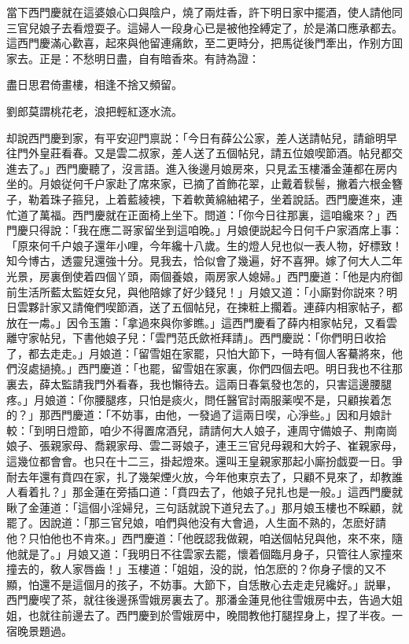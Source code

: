當下西門慶就在這婆娘心口與陰户，燒了兩炷香，許下明日家中擺酒，使人請他同三官兒娘子去看燈耍子。這婦人一段身心已是被他拴縛定了，於是滿口應承都去。這西門慶滿心歡喜，起來與他留連痛飲，至二更時分，把馬従後門牽出，作别方囬家去。正是：不愁明日盡，自有暗香來。有詩為證：

\begin{myquote}
盡日思君倚畫樓，相逢不捨又頻留。

劉郎莫謂桃花老，浪把輕紅逐水流。
\end{myquote}

却說西門慶到家，有平安迎門禀説：「今日有薛公公家，差人送請帖兒，請爺明早往門外皇莊看春。又是雲二叔家，差人送了五個帖兒，請五位娘喫節酒。帖兒都交進去了。」西門慶聽了，沒言語。進入後邊月娘房來，只見孟玉樓潘金蓮都在房内坐的。月娘従何千户家赴了席來家，已摘了首飾花翠，止戴着䯼髻，撇着六根金簪子，勒着珠子箍兒，上着藍綾襖，下着軟黄綿紬裙子，坐着說話。西門慶進來，連忙道了萬福。西門慶就在正面椅上坐下。問道：「你今日往那裏，這咱纔來？」西門慶只得說：「我在應二哥家留坐到這咱晚。」月娘便説起今日何千户家酒席上事：「原來何千户娘子還年小哩，今年纔十八歲。生的燈人兒也似一表人物，好標致！知今博古，透靈兒還強十分。見我去，恰似會了幾遍，好不喜狎。嫁了何大人二年光景，房裏倒使着四個丫頭，兩個養娘，兩房家人媳婦。」西門慶道：「他是内府御前生活所藍太監姪女兒，與他陪嫁了好少錢兒！」月娘又道：「小廝對你説來？明日雲夥計家又請俺們喫節酒，送了五個帖兒，在揀粧上擱着。連薛内相家帖子，都放在一䖏。」因令玉簫：「拿過來與你爹瞧。」這西門慶看了薛内相家帖兒，又看雲離守家帖兒，下書他娘子兒：「雲門范氏歛袵拜請」。西門慶説：「你們明日收拾了，都去走走。」月娘道：「留雪姐在家罷，只怕大節下，一時有個人客驀將來，他們沒處撾撓。」西門慶道：「也罷，留雪姐在家裏，你們四個去吧。明日我也不往那裏去，薛太監請我門外看春，我也懶待去。這兩日春氣發也怎的，只害這邊腰腿疼。」月娘道：「你腰腿疼，只怕是痰火，問任醫官討兩服薬喫不是，只顧挨着怎的？」那西門慶道：「不妨事，由他，一發過了這兩日喫，心淨些。」因和月娘計較：「到明日燈節，咱少不得置席酒兒，請請何大人娘子，連周守備娘子、荆南崗娘子、張親家母、喬親家母、雲二哥娘子，連王三官兒母親和大妗子、崔親家母，這幾位都會會。也只在十二三，掛起燈來。還叫王皇親家那起小廝扮戯耍一日。爭耐去年還有賁四在家，扎了幾架煙火放，今年他東京去了，只顧不見來了，却教誰人看着扎？」那金蓮在旁插口道：「賁四去了，他娘子兒扎也是一般。」這西門慶就瞅了金蓮道：「這個小淫婦兒，三句話就說下道兒去了。」那月娘玉樓也不睬顧，就罷了。因說道：「那三官兒娘，咱們與他没有大會過，人生面不熟的，怎麽好請他？只怕他也不肯來。」西門慶道：「他旣認我做親，咱送個帖兒與他，來不來，隨他就是了。」月娘又道：「我明日不往雲家去罷，懷着個臨月身子，只管往人家撞來撞去的，敎人家唇齒！」玉樓道：「姐姐，没的説，怕怎麽的？你身子懷的又不顯，怕還不是這個月的孩子，不妨事。大節下，自恁散心去走走兒纔好。」説畢，西門慶喫了茶，就往後邊孫雪娥房裏去了。那潘金蓮見他往雪娥房中去，告過大姐姐，也就往前邊去了。西門慶到於雪娥房中，晚間教他打腿捏身上，捏了半夜。一宿晚景題過。

